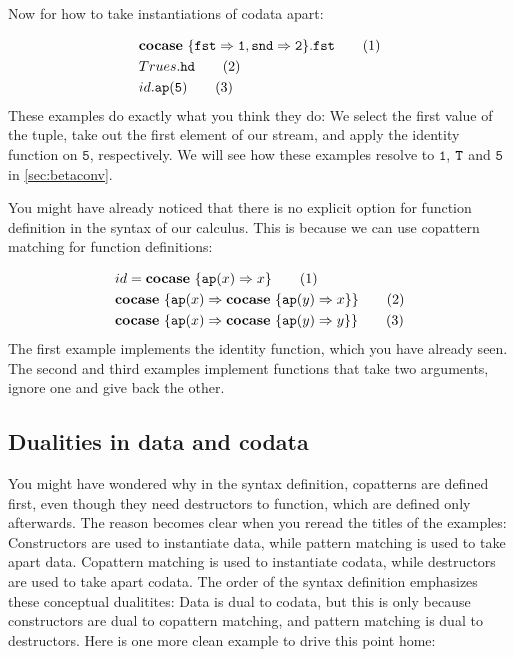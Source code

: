 \documentclass[twoside,12pt,a4paper]{article}
\begin{document}
Now for how to take instantiations of codata apart:

\begin{example}
    \begin{align*}
        &\textbf{cocase}\ \{\mathtt{fst\Rightarrow 1, snd\Rightarrow 2}\}.\mathtt{fst}\tag{1}\\
        &Trues.\mathtt{hd}\tag{2}\\
        &id.\texttt{ap}(\mathtt{5})\tag{3}
    \end{align*}
    These examples do exactly what you think they do: We select the first value of the tuple, 
    take out the first element of our stream, and apply the identity function on $\mathtt{5}$, respectively.
    We will see how these examples resolve to $\mathtt{1}$, $\mathtt{T}$ and $\mathtt{5}$ in \cref{sec:betaconv}.
\end{example} 

You might have already noticed that there is no explicit option for function definition in the syntax of our calculus.
This is because we can use copattern matching for function definitions:
\begin{example}
    \begin{align*}
        &id = \textbf{cocase}\ \{\texttt{ap}(x)\Rightarrow x\}\tag{1}\\
        &\textbf{cocase}\ \{\texttt{ap}(x)\Rightarrow \textbf{cocase}\ \{\texttt{ap}(y)\Rightarrow x\}\} \tag{2} \\
        &\textbf{cocase}\ \{\texttt{ap}(x)\Rightarrow \textbf{cocase}\ \{\texttt{ap}(y)\Rightarrow y\}\} \tag{3}
    \end{align*}
    The first example implements the identity function, which you have already seen. 
    The second and third examples implement functions that take two arguments, ignore one and give back the other.
\end{example}

\subsection{Dualities in data and codata}
You might have wondered why in the syntax definition, copatterns are defined first, even though they need destructors to function, which are defined only afterwards.
The reason becomes clear when you reread the titles of the examples:
Constructors are used to instantiate data, while pattern matching is used to take apart data.
Copattern matching is used to instantiate codata, while destructors are used to take apart codata.
The order of the syntax definition emphasizes these conceptual dualitites:
Data is dual to codata, but this is only because constructors are dual to copattern matching, 
and pattern matching is dual to destructors.
Here is one more clean example to drive this point home:  
\end{document}
